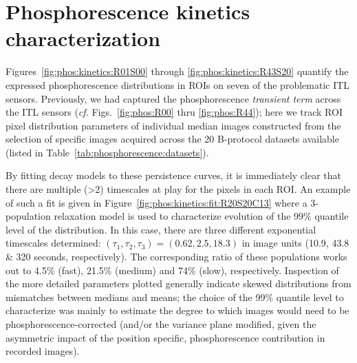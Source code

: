 \section{Phosphorescence kinetics characterization}
\label{appendix:phos:kinetics}

Figures~\ref{fig:phos:kinetics:R01S00} through \ref{fig:phos:kinetics:R43S20} quantify the expressed phosphorescence distributions in ROIs on seven of the problematic ITL sensors. Previously, we had captured the phosphorescence {\it transient term} across the ITL sensors ({\it cf.} Figs.~\ref{fig:phos:R00} thru \ref{fig:phos:R44}); here we track ROI pixel distribution parameters of individual median images constructed from the selection of specific images acquired across the 20 B-protocol datasets available (listed in Table~\ref{tab:phosphorescence:datasets}). 

By fitting decay models to these persistence curves, it is immediately clear that there are multiple (>2) timescales at play for the pixels in each ROI. An example of such a fit is given in Figure~\ref{fig:phos:kinetics:fit:R20S20C13} where a 3-population relaxation model is used to characterize evolution of the 99\% quantile level of the distribution. In this case, there are three different exponential timescales determined: $(\tau_1,\tau_2,\tau_3) = (0.62,2.5,18.3)$ in image units (10.9, 43.8 \& 320 seconds, respectively). The corresponding ratio of these populations works out to 4.5\% (fast), 21.5\% (medium) and 74\% (slow), respectively. Inspection of the more detailed parameters plotted generally indicate skewed distributions from mismatches between medians and means; the choice of the 99\% quantile level to characterize was mainly to estimate the degree to which images would need to be phosphorescence-corrected (and/or the variance plane modified, given the asymmetric impact of the position specific, phosphorescence contribution in recorded images). 

